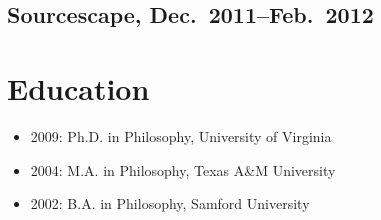 \documentclass{article}
\begin{document}
  \subsection{Sourcescape, Dec.\ 2011--Feb.\ 2012} %
  \label{sub:Sourcescape}
  

\section{Education} %
\label{sec:Education}

\begin{itemize}
  \item 2009: Ph.D. in Philosophy, University of Virginia
  \item 2004: M.A. in Philosophy, Texas A\&M University
  \item 2002: B.A. in Philosophy, Samford University
\end{itemize}
\end{document}
